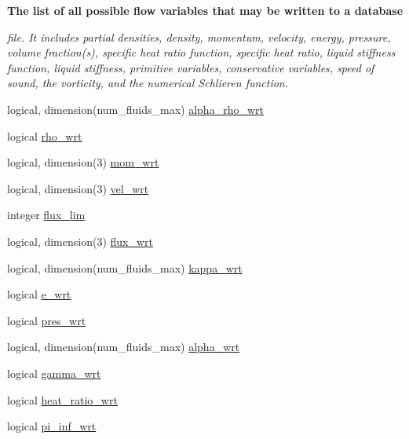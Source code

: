 \begin{Indent}\textbf{ The list of all possible flow variables that may be written to a database}\par
{\em file. It includes partial densities, density, momentum, velocity, energy, pressure, volume fraction(s), specific heat ratio function, specific heat ratio, liquid stiffness function, liquid stiffness, primitive variables, conservative variables, speed of sound, the vorticity, and the numerical Schlieren function. }\begin{DoxyCompactItemize}
\item 
logical, dimension(num\+\_\+fluids\+\_\+max) \hyperlink{namespacem__global__parameters_a629b922f4d06112a6d03d7864872990f}{alpha\+\_\+rho\+\_\+wrt}
\item 
logical \hyperlink{namespacem__global__parameters_aabc3362b8f53b08f4f113e699d449754}{rho\+\_\+wrt}
\item 
logical, dimension(3) \hyperlink{namespacem__global__parameters_a5d11d820127525a02b4c6f9d09fad258}{mom\+\_\+wrt}
\item 
logical, dimension(3) \hyperlink{namespacem__global__parameters_ae4ab7caa7dee5e616b217437f7f2b87f}{vel\+\_\+wrt}
\item 
integer \hyperlink{namespacem__global__parameters_acbb163a79ff0011a4327c3fb65a04c14}{flux\+\_\+lim}
\item 
logical, dimension(3) \hyperlink{namespacem__global__parameters_a35133a9d59c33919af73594f804d2fd9}{flux\+\_\+wrt}
\item 
logical, dimension(num\+\_\+fluids\+\_\+max) \hyperlink{namespacem__global__parameters_ab6d5da2756e61a0695236e24ad920e38}{kappa\+\_\+wrt}
\item 
logical \hyperlink{namespacem__global__parameters_a81724112f8d98fe4345fc37eb13a51b2}{e\+\_\+wrt}
\item 
logical \hyperlink{namespacem__global__parameters_a444f5e3df80f338ae77ccecd326a325f}{pres\+\_\+wrt}
\item 
logical, dimension(num\+\_\+fluids\+\_\+max) \hyperlink{namespacem__global__parameters_a61f570bcde70f7013523e11d93c66929}{alpha\+\_\+wrt}
\item 
logical \hyperlink{namespacem__global__parameters_a610d39b1d30ffa66fead89c936c83226}{gamma\+\_\+wrt}
\item 
logical \hyperlink{namespacem__global__parameters_ad9c6ef3b20d42a8c3dababd60c20cca3}{heat\+\_\+ratio\+\_\+wrt}
\item 
logical \hyperlink{namespacem__global__parameters_afb66fcff0c17f2298a9b7a35c85dedb7}{pi\+\_\+inf\+\_\+wrt}

\end{DoxyCompactItemize}
\end{Indent}
